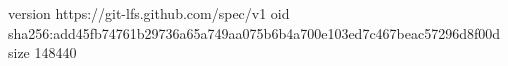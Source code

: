 version https://git-lfs.github.com/spec/v1
oid sha256:add45fb74761b29736a65a749aa075b6b4a700e103ed7c467beac57296d8f00d
size 148440
